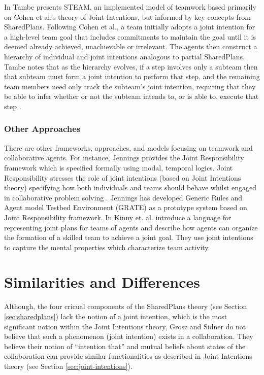\documentclass[11pt]{article}
\begin{document}
In \cite{tambe:flexible-teamwork} Tambe presents STEAM, an implemented model of
teamwork based primarily on Cohen et al.'s theory of Joint Intentions, but
informed by key concepts from SharedPlans. Following Cohen et al., a team
initially adopts a joint intention for a high-level team goal that includes
commitments to maintain the goal until it is deemed already achieved,
unachievable or irrelevant. The agents then construct a hierarchy of individual
and joint intentions analogous to partial SharedPlans. Tambe notes that as the
hierarchy evolves, if a step involves only a subteam then that subteam must form
a joint intention to perform that step, and the remaining team members need only
track the subteam's joint intention, requiring that they be able to infer
whether or not the subteam intends to, or is able to, execute that step
\cite{hunsberger:shared-plans-easier}.

\subsubsection{Other Approaches}

There are other frameworks, approaches, and models focusing on teamwork and
collaborative agents. For instance, Jennings provides the Joint Responsibility
framework which is specified formally using modal, temporal logics. Joint
Responsibility stresses the role of joint intentions (based on Joint Intentions
theory) specifying how both individuals and teams should behave whilst engaged
in collaborative problem solving \cite{jennings:joint-intention-hybrid}
\cite{jennings:joint-responsibility} \cite{jennings:on-responsible}
\cite{jennings:joint-responsibility-dynamic}. Jennings has developed Generic
Rules and Agent model Testbed Environment (GRATE) as a prototype system based on
Joint Responsibility framework. In \cite{kinny:planned-team} Kinny et.
al. introduce a language for representing joint plans for teams of agents and
describe how agents can organize the formation of a skilled team to achieve a
joint goal. They use joint intentions to capture the mental properties which
characterize team activity.

\section{Similarities and Differences}

Although, the four cricual components of the SharedPlans theory (see Section
\ref{sec:sharedplans}) lack the notion of a joint intention, which is the most
significant notion within the Joint Intentions theory, Grosz and Sidner do not
believe that such a phenomenon (joint intention) exists in a collaboration. They
believe their notion of ``intention that'' and mutual beliefs about states of
the collaboration can provide similar functionalities as described in Joint
Intentions theory (see Section \ref{sec:joint-intentions}).
\end{document}
